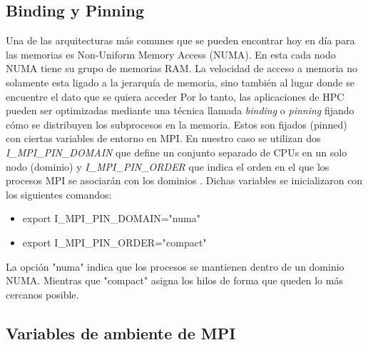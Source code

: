\documentclass[conference,compsoc]{IEEEtran}
\begin{document}
\subsection{Binding y Pinning}
 Una de las arquitecturas más comunes que se pueden encontrar hoy en día para las memorias es Non-Uniform Memory Access (NUMA). En esta cada nodo NUMA tiene su grupo de memorias RAM. La velocidad de acceso a memoria no solamente esta ligado a la jerarquía de memoria, sino también al lugar donde se encuentre el dato que se quiera acceder \cite{Meta-Volante-0} Por lo tanto, las aplicaciones de HPC pueden ser optimizadas mediante una técnica llamada \textit{binding} o \textit{pinning} fijando cómo se distribuyen los subprocesos en la memoria. Estos son fijados (pinned) con ciertas variables de entorno en MPI. En nuestro caso se utilizan dos \textit{I\_MPI\_PIN\_DOMAIN} que define un conjunto separado de CPUs en un solo nodo (dominio) y \textit{I\_MPI\_PIN\_ORDER} que indica el orden en el que los procesos MPI se asociarán con los dominios \cite{biding-pinning}. Dichas variables se inicializaron con los siguientes comandos:

 \begin{itemize}
 \item export I\_MPI\_PIN\_DOMAIN="numa"
 \item export I\_MPI\_PIN\_ORDER="compact"
 \end{itemize}

La opción "numa" indica que los procesos se mantienen dentro de un dominio NUMA. Mientras que "compact" asigna los hilos de forma que queden lo más cercanos posible.

\subsection{Variables de ambiente de MPI}
\end{document}
